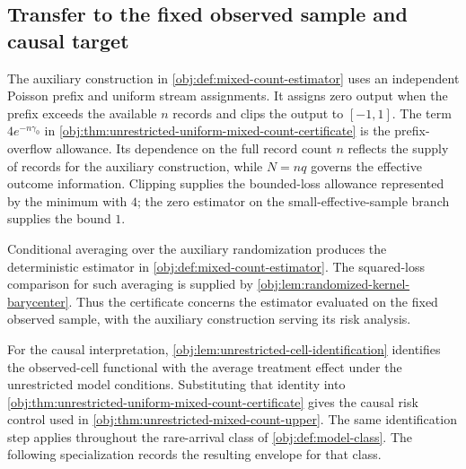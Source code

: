 \documentclass[11pt]{article}
\begin{document}
\subsection{Transfer to the fixed observed sample and causal target}

The auxiliary construction in \cref{obj:def:mixed-count-estimator} uses an independent Poisson prefix and uniform stream assignments. It assigns zero output when the prefix exceeds the available \(n\) records and clips the output to \([-1,1]\). The term \(4e^{-n\gamma_0}\) in \cref{obj:thm:unrestricted-uniform-mixed-count-certificate} is the prefix-overflow allowance. Its dependence on the full record count \(n\) reflects the supply of records for the auxiliary construction, while \(N=nq\) governs the effective outcome information. Clipping supplies the bounded-loss allowance represented by the minimum with \(4\); the zero estimator on the small-effective-sample branch supplies the bound \(1\).

Conditional averaging over the auxiliary randomization produces the deterministic estimator in \cref{obj:def:mixed-count-estimator}. The squared-loss comparison for such averaging is supplied by \cref{obj:lem:randomized-kernel-barycenter}. Thus the certificate concerns the estimator evaluated on the fixed observed sample, with the auxiliary construction serving its risk analysis.

For the causal interpretation, \cref{obj:lem:unrestricted-cell-identification} identifies the observed-cell functional with the average treatment effect under the unrestricted model conditions. Substituting that identity into \cref{obj:thm:unrestricted-uniform-mixed-count-certificate} gives the causal risk control used in \cref{obj:thm:unrestricted-mixed-count-upper}. The same identification step applies throughout the rare-arrival class  of \cref{obj:def:model-class}. The following specialization records the resulting envelope for that class.
\end{document}
